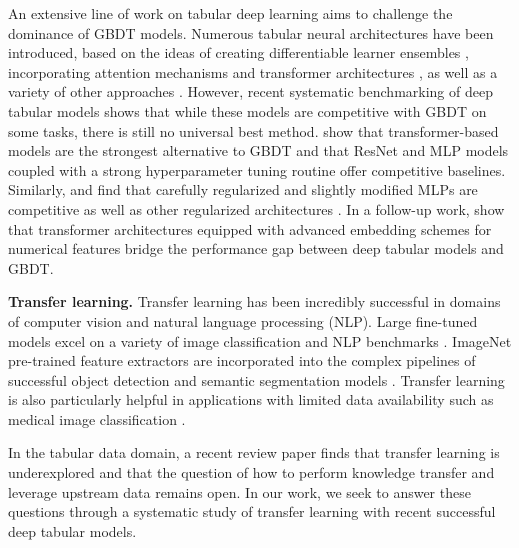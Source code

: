An extensive line of work on tabular deep learning aims to challenge the dominance of GBDT models. Numerous tabular neural architectures have been introduced, based on the ideas of creating differentiable learner ensembles \citep{popov2019neural, hazimeh2020tree, yang2018deep, kontschieder2015deep, badirli2020gradient}, incorporating attention mechanisms and transformer architectures \citep{somepalli2021saint, gorishniy2021revisiting, arik2021tabnet, huang2020tabtransformer, song2019autoint, kossen2021self}, as well as a variety of other approaches \citep{wang2017deep, wang2021dcn, beutel2018latent, klambauer2017self, fiedler2021simple, schafl2021hopular}. However, recent systematic benchmarking of deep tabular models \citep{gorishniy2021revisiting, SHWARTZZIV202284} shows that while these models are competitive with GBDT on some tasks, there is still no universal best method. \citet{gorishniy2021revisiting} show that transformer-based models are the strongest alternative to GBDT and that ResNet and MLP models coupled with a strong hyperparameter tuning routine \citep{akiba2019optuna} offer competitive baselines. Similarly, \citet{kadra2021regularization} and \citet{fiedler2021simple} find that carefully regularized and slightly modified MLPs are competitive as well as other regularized architectures \citep{yang2022locally}. In a follow-up work, \citet{gorishniy2022embeddings} show that transformer architectures equipped with advanced embedding schemes for numerical features bridge the performance gap between deep tabular models and GBDT.

{\bf Transfer learning.} Transfer learning \citep{pan2010survey, weiss2016survey, zhuang2020comprehensive} has been incredibly successful in domains of computer vision and natural language processing (NLP). Large fine-tuned models excel on a variety of image classification \citep{dosovitskiy2020image, dai2021coatnet} and NLP benchmarks  \citep{devlin2019bert, howard2018universal}. ImageNet \citep{imagenet} pre-trained feature extractors are incorporated into the complex pipelines of successful object detection and semantic segmentation models \citep{chen2018encoder, ren2015faster, redmon2018yolov3, redmon2016you}. Transfer learning is also particularly helpful in applications with limited data availability such as medical image classification \citep{alzubaidi2021novel, heker2020joint, chen2019med3d, alzubaidi2020deep}.

In the tabular data domain, a recent review paper \citep{borisov2021deep} finds that transfer learning is underexplored and that the question of how to perform knowledge transfer and leverage upstream data remains open. In our work, we seek to answer these questions through a systematic study of transfer learning with recent successful deep tabular models. 

